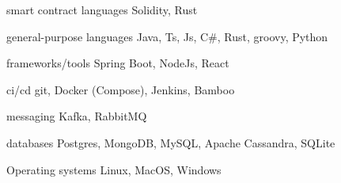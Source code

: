 

\begin{cvskills}

  \cvskill
    {smart contract languages} %
    {Solidity, Rust} %

  \cvskill
    {general-purpose languages} %
    {Java, Ts, Js, C\#, Rust, groovy, Python} %

  \cvskill
    {frameworks/tools} %
    {Spring Boot, NodeJs, React} %

  \cvskill
    {ci/cd} %
    {git, Docker (Compose), Jenkins, Bamboo} %

  \cvskill
    {messaging} %
    {Kafka, RabbitMQ} %

  \cvskill
    {databases} %
    {Postgres, MongoDB, MySQL, Apache Cassandra, SQLite} %

  \cvskill
    {Operating systems} %
    {Linux, MacOS, Windows} %

\end{cvskills}

